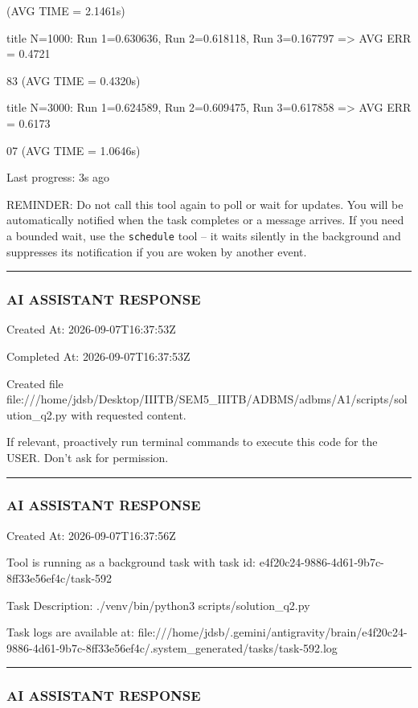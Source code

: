\documentclass[11pt,a4paper]{article}
\begin{document}
(AVG TIME = 2.1461s)

title N=1000: Run 1=0.630636, Run 2=0.618118, Run 3=0.167797 => AVG ERR = 0.4721

83 (AVG TIME = 0.4320s)

title N=3000: Run 1=0.624589, Run 2=0.609475, Run 3=0.617858 => AVG ERR = 0.6173

07 (AVG TIME = 1.0646s)


Last progress: 3s ago



REMINDER: Do not call this tool again to poll or wait for updates. You will be automatically notified when the task completes or a message arrives. If you need a bounded wait, use the \texttt{schedule} tool -- it waits silently in the background and suppresses its notification if you are woken by another event.


\hrule

\subsubsection{AI ASSISTANT RESPONSE}

Created At: 2026-09-07T16:37:53Z

Completed At: 2026-09-07T16:37:53Z

Created file file:///home/jdsb/Desktop/IIITB/SEM5\_IIITB/ADBMS/adbms/A1/scripts/solution\_q2.py with requested content.

If relevant, proactively run terminal commands to execute this code for the USER. Don't ask for permission.


\hrule

\subsubsection{AI ASSISTANT RESPONSE}

Created At: 2026-09-07T16:37:56Z

Tool is running as a background task with task id: e4f20c24-9886-4d61-9b7c-8ff33e56ef4c/task-592

Task Description: ./venv/bin/python3 scripts/solution\_q2.py

Task logs are available at: file:///home/jdsb/.gemini/antigravity/brain/e4f20c24-9886-4d61-9b7c-8ff33e56ef4c/.system\_generated/tasks/task-592.log


\hrule

\subsubsection{AI ASSISTANT RESPONSE}
\end{document}
